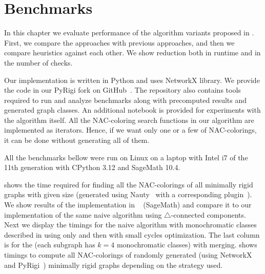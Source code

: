 \chapter{Benchmarks}%
\label{chapter:benchmarks}

\begin{chapterabstract}

	In this chapter we evaluate performance of the algorithm
	variants proposed in .
	First, we compare the approaches with previous approaches,
	and then we compare heuristics against each other.
	We show reduction both in runtime and in the number
	of \IsNACColoring{} checks.

\end{chapterabstract}


Our implementation is written in Python and uses NetworkX library.
We provide the code in our PyRigi fork on GitHub~\cite{pyrigi_github_lastaapps}.
The repository also contains tools required to run and analyze benchmarks
along with precomputed results and generated graph classes.
An additional notebook is provided for experiments with the algorithm itself.
All the NAC-coloring search functions in our algorithm are implemented
as iterators. Hence, if we want only one or a few of NAC-colorings,
it can be done without generating all of them.

All the benchmarks bellow were run on Linux
on a laptop with Intel i7 of the 11th generation
with CPython 3.12 and SageMath 10.4.

 shows the time required for finding all the NAC-colorings
of all minimally rigid graphs with given size (generated using Nauty~\cite{nauty}
with a corresponding plugin~\cite{nauty_plugin}).
We show results of the implementation in \flexrilog{}~\cite{flexrilog_github} (SageMath)
and compare it to our implementation of the same naive algorithm using $\triangle$-connected components.
Next we display the timings for the naive algorithm with monochromatic classes
described in  using only \IsNACColoring{}
and then with small cycles optimization.
The last column is for the \NeighborsDegree{} (each subgraph has $k=4$ monochromatic classes)
with \MergeLinear{} merging.
 shows timings to compute all NAC-colorings of
randomly generated (using NetworkX~\cite{networkx} and
PyRigi~\cite{pyrigi}) minimally rigid graphs depending on the strategy used.


